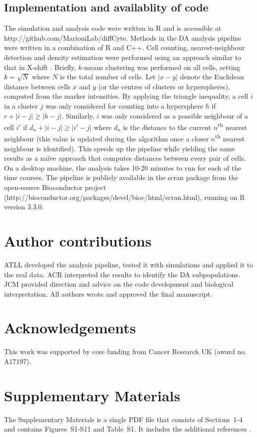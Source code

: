 \documentclass{article}
\newcommand{\suppannotate}{4}
\newcommand{\suppfigclustersim}{S11}
\begin{document}
\subsection{Implementation and availablity of code}
The simulation and analysis code were written in R and is accessible at {http://\-github.com/\-MarioniLab/\-diffCyte}.
Methods in the DA analysis pipeline were written in a combination of R and C++.
Cell counting, nearest-neighbour detection and density estimation were performed using an approach similar to that in X-shift \cite{samusik2016automated}.
Briefly, $k$-means clustering was performed on all cells, setting $k=\sqrt{N}$ where $N$ is the total number of cells.
Let $|x-y|$ denote the Euclidean distance between cells $x$ and $y$ (or the centres of clusters or hyperspheres), computed from the marker intensities.
By applying the triangle inequality, a cell $i$ in a cluster $j$ was only considered for counting into a hypersphere $h$ if $r + |i-j| \ge |h-j|$.
Similarly, $i$ was only considered as a possible neighbour of a cell $i'$ if $d_n + |i-j| \ge |i'-j|$ where $d_n$ is the distance to the current $n$\textsuperscript{th} nearest neighbour (this value is updated during the algorithm once a closer $n$\textsuperscript{th} nearest neighbour is identified).
This speeds up the pipeline while yielding the same results as a na\"ive approach that computes distances between every pair of cells.
On a desktop machine, the analysis takes 10-20 minutes to run for each of the time courses.
The pipeline is publicly available in the scran package from the open-source Bioconductor project \cite{gentleman2004bioconductor} (http://\-bioconductor.org\-/packages\-/devel\-/bioc\-/html\-/\-scran.html), running on R version 3.3.0. 

\section{Author contributions}
ATLL developed the analysis pipeline, tested it with simulations and applied it to the real data. 
ACR interpreted the results to identify the DA subpopulations.
JCM provided direction and advice on the code development and biological interpretation.
All authors wrote and approved the final manuscript.

\section{Acknowledgements}
This work was supported by core funding from Cancer Research UK (award no. A17197).

\section{Supplementary Materials}
The Supplementary Materials is a single PDF file that consists of Sections~1-\suppannotate{} and contains Figures~S1-\suppfigclustersim{} and Table~S1.
It includes the additional references \cite{robinson2010scaling,mccarthy2009treat,reiner2003identifying,kim2008effects}.



\end{document}
